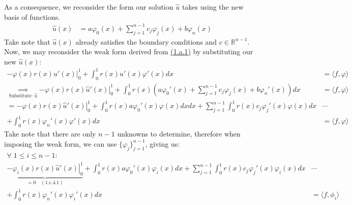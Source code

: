\documentclass[]{article}
\begin{document}
        \par
        As a consequence, we reconsider the form our solution $\hat{u}$ takes using the new basis of functions.
        \begin{align*}\tag{1.e.2}\label{eqn:1.e.2}
            \hat{u}(x) &= 
            a\varphi_0(x) + \sum_{j = 1}^{n - 1}c_j\varphi_j(x) + b\varphi_n(x)
        \end{align*}
        Take note that $\hat{u}(x)$ already satisfies the boundary conditions and $c\in \mathbb{R}^{n - 1}$. Now, we may reconsider the weak form derived from \hyperref[eqn:1.a.1]{(1.a.1)} by substituting our new $\hat{u}(x)$: 
        \begin{align*}\tag{1.e.3}\label{eqn:1.e.3}
            -\left.\varphi(x)r(x)u'(x)\right|_0^1
            +
            \int_{0}^{1} 
                r(x)u'(x)\varphi'(x)
            dx
            &= \langle f, \varphi\rangle
            \\
            \underset{\text{Substitute: } \hat{u}}{\implies}
            \left.
            -\varphi(x)r(x)\hat{u}'(x)
            \right|_0^1
            + 
            \int_{0}^{1} 
                r(x)\left(
                        a\varphi_0'(x)
                        + 
                        \sum_{j = 1}^{n - 1} c_j\varphi_j(x)
                        + 
                        b\varphi_n'(x)
                    \right)
            dx
            &= 
            \langle f, \varphi\rangle
            \\ 
            =
            \left.
            -\varphi(x)r(x)\hat{u}'(x)
            \right|_0^1
            + 
            \int_{0}^{1} 
                r(x)a\varphi_0'(x)\varphi(x)dx
            dx
            + 
            \sum_{j = 1}^{n - 1}
                \int_{0}^{1} 
                    r(x)c_j\varphi_j'(x)\varphi(x)
                dx&\cdots
            \\
            + 
            \int_{0}^{1}r(x)\varphi_n'(x)\varphi'(x) dx
            &= 
            \langle f, \varphi\rangle
        \end{align*}
        Take note that there are only $n - 1$ unknowns to determine, therefore when imposing the weak form, we can use $\{\varphi_j\}_{j = 1}^{n - 1}$, giving us:
        \begin{align*}\tag{1.e.4}\label{eqn:1.e.4}
            \forall\; 1 \le i \le n - 1: \; \hspace{10em}& 
            \\
            \underbrace{\left.
            -\varphi_i(x)r(x)\hat{u}'(x)
            \right|_0^1}_{=0 \quad(1.e.4.1)}
            + 
            \int_{0}^{1} 
                r(x)a\varphi_0'(x)\varphi_i(x)
            dx
            + 
            \sum_{j = 1}^{n - 1}
                \int_{0}^{1} 
                    r(x)c_j\varphi_j'(x)\varphi_i(x)
                dx&\cdots
            \\
            + 
            \int_{0}^{1}r(x)\varphi_n'(x)\varphi_i'(x) dx
            &= \langle f, \phi_i\rangle
        \end{align*}
\end{document}
